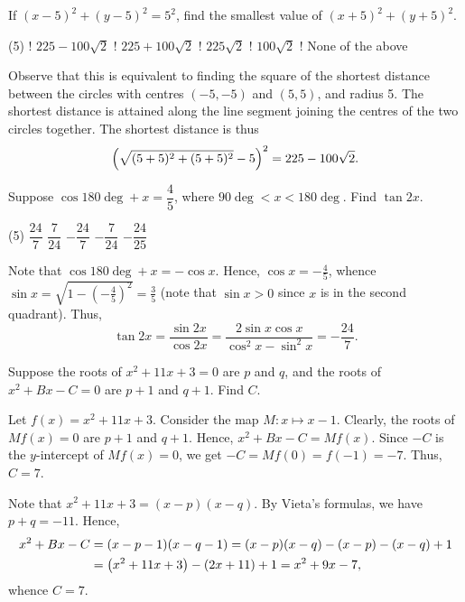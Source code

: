 \begin{question}[A]\label{Q::2023-S-1-4}
    If $(x-5)^2 + (y-5)^2 = 5^2$, find the smallest value of $(x+5)^2 + (y+5)^2$.
    \begin{tasks}(5)
        \task! $225 - 100\sqrt2$
        \task! $225 + 100\sqrt2$
        \task! $225\sqrt2$
        \task! $100\sqrt2$
        \task! None of the above
    \end{tasks}
\end{question}
\begin{solution*}
    Observe that this is equivalent to finding the square of the shortest distance between the circles with centres $(-5, -5)$ and $(5, 5)$, and radius 5. The shortest distance is attained along the line segment joining the centres of the two circles together. The shortest distance is thus \[\left( \sqrt{(5+5)^2 + (5+5)^2} - 5 \right)^2 = 225 - 100\sqrt2.\]
\end{solution*}

\begin{question}[C]\label{Q::2023-S-1-5}
    Suppose $\cos{180\deg + x} = \dfrac45$, where $90\deg < x < 180\deg$. Find $\tan{2x}$.
    \begin{tasks}(5)
        \task $\dfrac{24}{7}$
        \task $\dfrac{7}{24}$
        \task $-\dfrac{24}{7}$
        \task $-\dfrac{7}{24}$
        \task $-\dfrac{24}{25}$
    \end{tasks}
\end{question}
\begin{solution*}
    Note that $\cos{180\deg + x} = -\cos{x}$. Hence, $\cos{x} = -\frac45$, whence $\sin x = \sqrt{1 - (-\frac45)^2} = \frac35$ (note that $\sin x > 0$ since $x$ is in the second quadrant). Thus, \[\tan{2x} = \frac{\sin{2x}}{\cos{2x}} = \frac{2\sin x \cos x}{\cos^2 x - \sin^2 x} = -\frac{24}{7}.\]
\end{solution*}

\begin{question}[7]\label{Q::2023-S-1-6}
    Suppose the roots of $x^2 + 11x + 3 = 0$ are $p$ and $q$, and the roots of $x^2 + Bx - C = 0$ are $p+1$ and $q+1$. Find $C$.
\end{question}
\begin{solution}
    Let $f(x) = x^2 + 11x + 3$. Consider the map $M : x \mapsto x - 1$. Clearly, the roots of $Mf(x) = 0$ are $p+1$ and $q+1$. Hence, $x^2 + Bx - C = Mf(x)$. Since $-C$ is the $y$-intercept of $Mf(x) = 0$, we get $-C = Mf(0) = f(-1) = -7$. Thus, $C = 7$.
\end{solution}
\begin{solution}
    Note that $x^2 + 11x + 3 = (x-p)(x-q)$. By Vieta's formulas, we have $p + q = -11$. Hence,
    \begin{align*}
        x^2 + Bx - C &= (x-p - 1)(x-q - 1) = (x-p)(x-q) - (x-p) - (x-q) + 1 \\
        &= \left( x^2 + 11x + 3 \right) - \left( 2x + 11 \right) + 1 = x^2 + 9x - 7,
    \end{align*}
    whence $C = 7$.
\end{solution}

